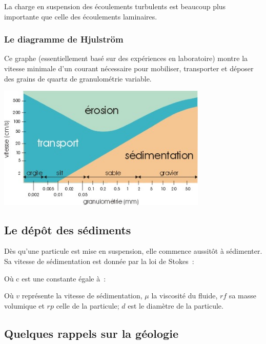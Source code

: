 \documentclass[a4paper,11pt]{article}
\begin{document}
La charge en suspension des écoulements turbulents est beaucoup plus importante que celle des écoulements laminaires.

\subsubsection{Le diagramme de Hjulström}
Ce graphe (essentiellement basé sur des expériences en laboratoire) montre la vitesse minimale d'un courant nécessaire pour mobiliser, transporter et déposer des grains de quartz de granulométrie variable.

\begin{center}
  \includegraphics[width=10cm]{Images/transport_1.png}
\end{center}

\subsection{Le dépôt des sédiments}

Dès qu'une particule est mise en suspension, elle commence aussitôt à sédimenter. Sa vitesse de sédimentation est donnée par la loi de Stokes~:
\begin{center}
\end{center}
Où c est une constante égale à~:
\begin{center}
\end{center}

Où $v$ représente la vitesse de sédimentation, $\mu$ la viscosité du fluide, $rf$ sa masse volumique et $rp$ celle de la particule; $d$ est le diamètre de la particule.

\subsection{Quelques rappels sur la géologie}
\end{document}
